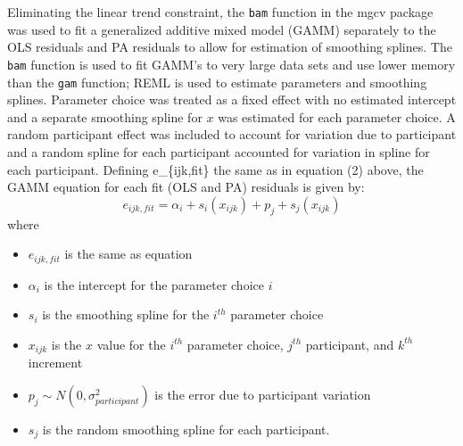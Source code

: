 \documentclass[12pt]{article}
\providecommand{\tightlist}{%
  \setlength{\itemsep}{0pt}\setlength{\parskip}{0pt}}
\begin{document}
Eliminating the linear trend constraint, the \texttt{bam} function in
the mgcv package \citep{mgcv_pkg} was used to fit a generalized additive
mixed model (GAMM) separately to the OLS residuals and PA residuals to
allow for estimation of smoothing splines. The \texttt{bam} function is
used to fit GAMM's to very large data sets and use lower memory than the
\texttt{gam} function; REML is used to estimate parameters and smoothing
splines. Parameter choice was treated as a fixed effect with no
estimated intercept and a separate smoothing spline for \(x\) was
estimated for each parameter choice. A random participant effect was
included to account for variation due to participant and a random spline
for each participant accounted for variation in spline for each
participant. Defining e\_\{ijk,fit\} the same as in equation (2) above,
the GAMM equation for each fit (OLS and PA) residuals is given by:
\begin{equation}
e_{ijk,fit} = \alpha_i + s_{i}(x_{ijk}) + p_{j} + s_{j}(x_{ijk})
\end{equation} \noindent where

\begin{itemize}
\tightlist
\item
  \(e_{ijk,fit}\) is the same as equation
\item
  \(\alpha_i\) is the intercept for the parameter choice \(i\)
\item
  \(s_{i}\) is the smoothing spline for the \(i^{th}\) parameter choice
\item
  \(x_{ijk}\) is the \(x\) value for the \(i^{th}\) parameter choice,
  \(j^{th}\) participant, and \(k^{th}\) increment
\item
  \(p_{j} \sim N(0, \sigma^2_{participant})\) is the error due to
  participant variation
\item
  \(s_{j}\) is the random smoothing spline for each participant.
\end{itemize}
\end{document}

